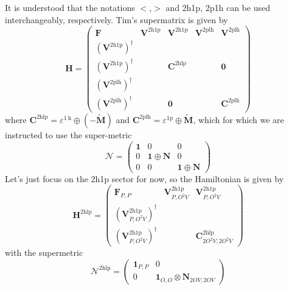 It is understood that the notations $<$,$>$ and 2h1p, 2p1h can be used interchangeably, respectively. Tim's supermatrix is given by
\begin{equation}
\bm{H} =
\begin{pmatrix}
\bm{F} & \bm{V}^{2\mathrm{h1p}} & \bm{V}^{2\mathrm{h1p}} & \bm{V}^{2\mathrm{plh}} & \bm{V}^{2\mathrm{plh}} \\
\left(\bm{V}^{2\mathrm{h1p}}\right)^{\dagger} &  &  & & \\
\left(\bm{V}^{2\mathrm{h1p}}\right)^{\dagger} &  & \bm{C}^{2\mathrm{hlp}} & & \bm{0} \\
\left(\bm{V}^{2\mathrm{plh}}\right)^{\dagger} & & & & \\
\left(\bm{V}^{2\mathrm{plh}}\right)^{\dagger} &  & \bm{0} & & \bm{C}^{2\mathrm{plh}}
\end{pmatrix}
\end{equation}
where $\mathbf{C}^{2 \mathrm{hlp}}=\varepsilon^{1 \mathrm{~h}} \oplus(-\tilde{\mathbf{M}})$ and $\mathbf{C}^{2 \mathrm{plh}}=\varepsilon^{1 \mathrm{p}} \oplus \tilde{\mathbf{M}}$, which for which we are instructed to use the super-metric
\begin{equation}
    \bm{\mathcal{N}} = \begin{pmatrix}
\bm{1} & 0 & 0 \\
0 & \bm{1} \oplus \bm{N} & 0 \\
0 & 0 & \bm{1} \oplus \bm{N}
    \end{pmatrix}
\end{equation}
Let's just focus on the 2h1p sector for now, so the Hamiltonian is given by
\begin{equation}
    \bm{H}^{2 \mathrm{hlp}} = 
    \begin{pmatrix}
        \bm{F}_{P,P} & \bm{V}^{2\mathrm{h1p}}_{P,O^2V} & \bm{V}^{2\mathrm{h1p}}_{P,O^2V} \\
        \left(\bm{V}^{2\mathrm{h1p}}_{P,O^2V}\right)^{\dagger} &  &  \\
        \left(\bm{V}^{2\mathrm{h1p}}_{P,O^2V}\right)^{\dagger} &  & \bm{C}^{2\mathrm{hlp}}_{2O^2V,2O^2V}
    \end{pmatrix}
\end{equation}
with the supermetric
\begin{equation}
    \bm{\mathcal{N}}^{2 \mathrm{hlp}} = \begin{pmatrix}
        \bm{1}_{P,P} & 0 \\
        0 & \bm{1}_{O,O} \otimes \bm{N}_{2OV,2OV}
    \end{pmatrix}
\end{equation}
